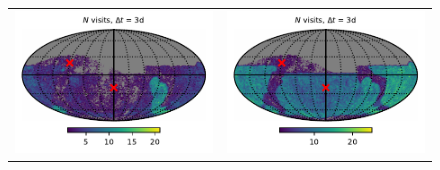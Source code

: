 \documentclass[preprintm,linenumbers]{aastex631}
\begin{document}
\begin{figure}
\begin{tabular}{@{}c@{}c@{}}
         \includegraphics{results/skymaps_cutout/skymaps_cutout_first_year_one_snap_v4_0_10yrs_db_noDD_noTwi_tscale-3_nside-256_doAllTemplateMetrics_reduceCount_g_noDD_noTwi.pdf} &
         \includegraphics{results/skymaps_cutout/skymaps_cutout_first_year_one_snap_v4_0_10yrs_db_noDD_noTwi_tscale-3_nside-256_doAllTemplateMetrics_reduceCount_r_noDD_noTwi.pdf} \\


\end{tabular}
\end{figure}
\end{document}
